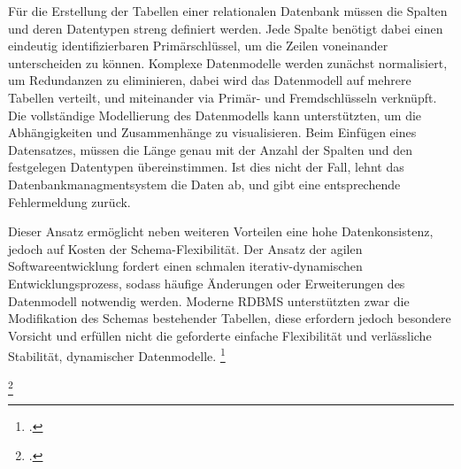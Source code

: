 Für die Erstellung der Tabellen einer relationalen Datenbank müssen die Spalten und deren Datentypen streng definiert werden. Jede Spalte benötigt dabei einen eindeutig identifizierbaren Primärschlüssel, um die Zeilen voneinander unterscheiden zu können. Komplexe Datenmodelle werden zunächst normalisiert, um Redundanzen zu eliminieren, dabei wird das Datenmodell auf mehrere Tabellen verteilt, und miteinander via Primär- und Fremdschlüsseln verknüpft. Die vollständige Modellierung des Datenmodells kann unterstützten, um die Abhängigkeiten und Zusammenhänge zu visualisieren. Beim Einfügen eines Datensatzes, müssen die Länge genau mit der Anzahl der Spalten und den festgelegen Datentypen übereinstimmen. Ist dies nicht der Fall, lehnt das Datenbankmanagmentsystem die Daten ab, und gibt eine entsprechende Fehlermeldung zurück.

Dieser Ansatz ermöglicht neben weiteren Vorteilen eine hohe Datenkonsistenz, jedoch auf Kosten der Schema-Flexibilität. Der Ansatz der agilen Softwareentwicklung fordert einen schmalen iterativ-dynamischen Entwicklungsprozess, sodass häufige Änderungen oder Erweiterungen des Datenmodell notwendig werden. Moderne RDBMS unterstützten zwar die Modifikation des Schemas bestehender Tabellen, diese erfordern jedoch besondere Vorsicht und erfüllen nicht die geforderte einfache Flexibilität und verlässliche Stabilität, dynamischer Datenmodelle. \footcite[S. 197]{harrisonNextGenerationDatabases2015}

\footcite{newardVietnamComputerScience2006}










